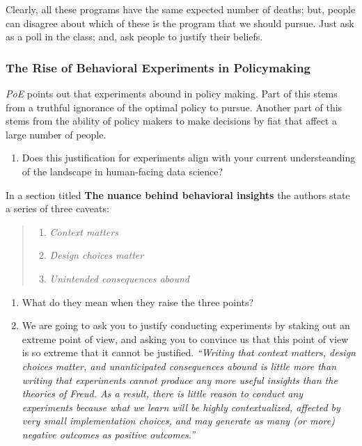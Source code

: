 \documentclass[
]{article}
\providecommand{\tightlist}{%
  \setlength{\itemsep}{0pt}\setlength{\parskip}{0pt}}
\theoremstyle{definition}
\theoremstyle{definition}
\theoremstyle{definition}
\theoremstyle{definition}
\theoremstyle{remark}
\begin{document}
Clearly, all these programs have the same expected number of deaths; but, people can disagree about which of these is the program that we should pursue. Just ask as a poll in the class; and, ask people to justify their beliefs.

\subsubsection{The Rise of Behavioral Experiments in Policymaking}\label{the-rise-of-behavioral-experiments-in-policymaking}

\emph{PoE} points out that experiments abound in policy making. Part of this stems from a truthful ignorance of the optimal policy to pursue. Another part of this stems from the ability of policy makers to make decisions by fiat that affect a large number of people.

\begin{enumerate}
\def\labelenumi{\arabic{enumi}.}
\tightlist
\item
  Does this justification for experiments align with your current understeanding of the landscape in human-facing data science?
\end{enumerate}

In a section titled \textbf{The nuance behind behavioral insights} the authors state a series of three caveats:

\begin{quote}
\begin{enumerate}
\def\labelenumi{\arabic{enumi}.}
\tightlist
\item
  \emph{Context matters}
\item
  \emph{Design choices matter}
\item
  \emph{Unintended consequences abound}
\end{enumerate}
\end{quote}

\begin{enumerate}
\def\labelenumi{\arabic{enumi}.}
\tightlist
\item
  What do they mean when they raise the three points?
\item
  We are going to ask you to justify conducting experiments by staking out an extreme point of view, and asking you to convince us that this point of view is so extreme that it cannot be justified. \emph{``Writing that context matters, design choices matter, and unanticipated consequences abound is little more than writing that experiments cannot produce any more useful insights than the theories of Freud. As a result, there is little reason to conduct any experiments because what we learn will be highly contextualized, affected by very small implementation choices, and may generate as many (or more) negative outcomes as positive outcomes.''}
\end{enumerate}
\end{document}
